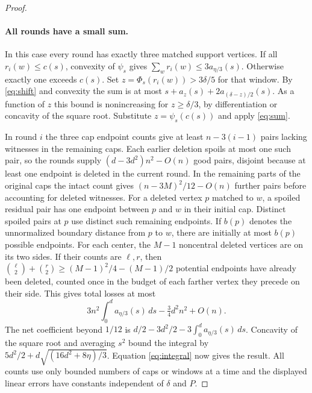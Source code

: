 \begin{proof}
\paragraph{All rounds have a small sum.}
In this case every round has exactly three matched support vertices. If all \(r_i(w)\le c(s)\), convexity of \(\psi_s\) gives \(\sum_w r_i(w)\le3a_{\eta/3}(s)\). Otherwise exactly one exceeds \(c(s)\). Set \(z=\Phi_s(r_i(w))>3\delta/5\) for that window. By \eqref{eq:shift} and convexity the sum is at most \(s+a_z(s)+2a_{(\delta-z)/2}(s)\). As a function of \(z\) this bound is nonincreasing for \(z\ge\delta/3\), by differentiation or concavity of the square root. Substitute \(z=\psi_s(c(s))\) and apply \eqref{eq:sum}.

In round \(i\) the three cap endpoint counts give at least \(n-3(i-1)\) pairs lacking witnesses in the remaining caps. Each earlier deletion spoils at most one such pair, so the rounds supply \((d-3d^2)n^2-O(n)\) good pairs, disjoint because at least one endpoint is deleted in the current round. In the remaining parts of the original caps the intact count gives \((n-3M)^2/12-O(n)\) further pairs before accounting for deleted witnesses. For a deleted vertex \(p\) matched to \(w\), a spoiled residual pair has one endpoint between \(p\) and \(w\) in their initial cap. Distinct spoiled pairs at \(p\) use distinct such remaining endpoints. If \(b(p)\) denotes the unnormalized boundary distance from \(p\) to \(w\), there are initially at most \(b(p)\) possible endpoints. For each center, the \(M-1\) noncentral deleted vertices are on its two sides. If their counts are \(\ell,r\), then \(\binom\ell2+\binom r2\ge (M-1)^2/4-(M-1)/2\) potential endpoints have already been deleted, counted once in the budget of each farther vertex they precede on their side. This gives total losses at most
\[
 3n^2\int_0^d a_{\eta/3}(s)\,ds-\tfrac34 d^2 n^2+O(n).
\]
The net coefficient beyond \(1/12\) is \(d/2-3d^2/2-3\int_0^d a_{\eta/3}(s)\,ds\). Concavity of the square root and averaging \(s^2\) bound the integral by \(5d^2/2+d\sqrt{(16d^2+8\eta)/3}\). Equation \eqref{eq:integral} now gives the result. All counts use only bounded numbers of caps or windows at a time and the displayed linear errors have constants independent of \(\delta\) and \(P\).
\end{proof}


